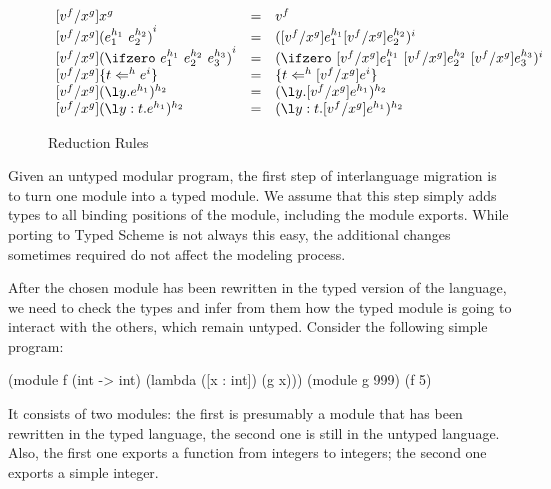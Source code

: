 \begin{schemeregion}
\begin{figure}
$$
\begin{array}{lcl}
 \dosub{x^g} & = &v^f\\
 \dosub{\comb{e_1^{h_1}}{ e_2^{h_2}}}^i & = & ([v^f/x^g]e_1^{h_1} [v^f/x^g]e_2^{h_2})^i\\
 \dosub{\ifz{e_1^{h_1}}{ e_2^{h_2}}{ e_3^{h_3}}}^i & = & 
 \ifz{\dosub{e_1^{h_1}}}{\dosub{e_2^{h_2}}}{\dosub{e_3^{h_3}}}^i\\
 \dosub{\cast{t}{h}{e^{i}}} & = & \cast{t}{h}{\dosub{e^i}}\\
 \dosub{\dlsabs{y}{e^{h_1}}^{h_2}} & = & {\dlsabs{y}{\dosub{e^{h_1}}}^{h_2}}\\
 \dosub{\Tabs{y}{t}{e^{h_1}}^{h_2}} & = & {\Tabs{y}{t}{\dosub{e^{h_1}}}^{h_2}}\\
\end{array}
$$
\caption{Reduction Rules} \label{fig:dls-reduction}
\end{figure}

Given an untyped modular program, the first step of interlanguage
 migration is to turn one module into a typed module. We assume that this
 step simply adds types to all binding positions of the module, including
 the module exports. While porting to Typed Scheme is not always this
 easy, the additional changes sometimes required do not affect the
 modeling process.

After the chosen module has been rewritten in the typed version of the
 language, we need to check the types and infer from them how the typed
 module is going to interact with the others, which remain untyped.
 Consider the following simple program: 
\begin{exmp}
\begin{schemedisplay}
(module f (int -> int) (lambda ([x : int]) (g x)))
(module g 999)
(f 5)
\end{schemedisplay}
\label{ex:dlsone}
\end{exmp}

It consists of two modules: the first is presumably a module that has
been rewritten in the typed language, the second one is still in the
untyped language. Also, the first one exports a function from integers
to integers; the second one exports a simple integer.


\end{schemeregion}
